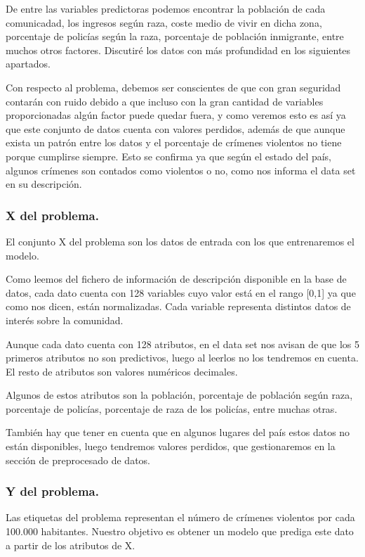 \documentclass[12pt, spanish]{article}
\begin{document}
De entre las variables predictoras podemos encontrar la población de cada comunicadad, los ingresos según raza, coste medio de vivir en dicha zona, porcentaje de policías según la raza, porcentaje de población inmigrante, entre muchos otros factores. Discutiré los datos con más profundidad en los siguientes apartados.


Con respecto al problema, debemos ser conscientes de que con gran seguridad contarán con ruido debido a que incluso con la gran cantidad de variables proporcionadas algún factor puede quedar fuera, y como veremos esto es así ya que este conjunto de datos cuenta con valores perdidos, además de que aunque exista un patrón entre los datos y el porcentaje de crímenes violentos no tiene porque cumplirse siempre. Esto se confirma ya que según el estado del país, algunos crímenes son contados como violentos o no, como nos informa el data set en su descripción.

\subsubsection{X del problema.}

El conjunto X del problema son los datos de entrada con los que entrenaremos el modelo. 

Como leemos del fichero de información de descripción disponible en la base de datos\cite{mlr_crimen}, cada dato cuenta con 128 variables cuyo valor está en el rango [0,1] ya que como nos dicen, están normalizadas. Cada variable representa distintos datos de interés sobre la comunidad.

Aunque cada dato cuenta con 128 atributos, en el data set nos avisan de que los 5 primeros atributos no son predictivos, luego al leerlos no los tendremos en cuenta. El resto de atributos son valores numéricos decimales.

Algunos de estos atributos son la población, porcentaje de población según raza, porcentaje de policías, porcentaje de raza de los policías, entre muchas otras.

También hay que tener en cuenta que en algunos lugares del país estos datos no están disponibles, luego tendremos valores perdidos, que gestionaremos en la sección de preprocesado de datos.

\subsubsection{Y del problema.}

Las etiquetas del problema representan el número de crímenes violentos por cada 100.000 habitantes. Nuestro objetivo es obtener un modelo que prediga este dato a partir de los atributos de X.
\end{document}
